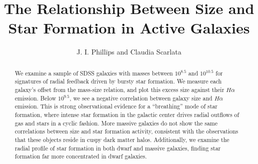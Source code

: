 \documentclass[iop]{emulateapj}
\begin{document}

\title{The Relationship Between Size and Star Formation in Active Galaxies}


\author{J. I. Phillips and Claudia Scarlata }




\begin{abstract}
We examine a sample of SDSS galaxies with masses between $10^{8.5}$ and $10^{10.5}$ for signatures of radial feedback driven by bursty star formation. We measure each galaxy's offset from the mass-size relation, and plot this excess size against their $H\alpha$ emission. Below $10^{9.5}$, we see a negative correlation between galaxy size and $H\alpha$ emission. This is strong observational evidence for a ``breathing'' mode of star formation, where intense star formation in the galactic center drives radial outflows of gas and stars in a cyclic fashion. More massive galaxies do not show the same correlations between size and star formation activity, consistent with the observations that these objects reside in cuspy dark matter halos. Additionally, we examine the radial profile of star formation in both dwarf and massive galaxies, finding star formation far more concentrated in dwarf galaxies.
\end{abstract}
\end{document}
